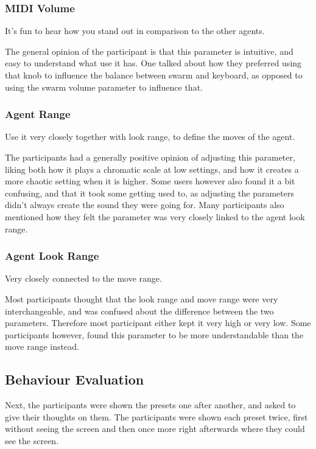 \documentclass[a4paper,english]{report}
\begin{document}
	\subsubsection{MIDI Volume}
	\begin{displayquote}
		It's fun to hear how you stand out in comparison to the other agents.
	\end{displayquote}
	The general opinion of the participant is that this parameter is intuitive, and easy to understand what use it has. One talked about how they preferred using that knob to influence the balance between swarm and keyboard, as opposed to using the swarm volume parameter to influence that.
	\subsubsection{Agent Range}
	\begin{displayquote}
		Use it very closely together with look range, to define the moves of the agent.
	\end{displayquote}
	The participants had a generally positive opinion of adjusting this parameter, liking both how it plays a chromatic scale at low settings, and how it creates a more chaotic setting when it is higher. Some users however also found it a bit confusing, and that it took some getting used to, as adjusting the parameters didn't always create the sound they were going for. Many participants also mentioned how they felt the parameter was very closely linked to the agent look range.
	\subsubsection{Agent Look Range}
	\begin{displayquote}
		Very closely connected to the move range.
	\end{displayquote}
	Most participants thought that the look range and move range were very interchangeable, and was confused about the difference between the two parameters. Therefore most participant either kept it very high or very low. Some participants however, found this parameter to be more understandable than the move range instead.
	\subsection{Behaviour Evaluation}
	Next, the participants were shown the presets one after another, and asked to give their thoughts on them. The participants were shown each preset twice, first without seeing the screen and then once more right afterwards where they could see the screen.
\end{document}
